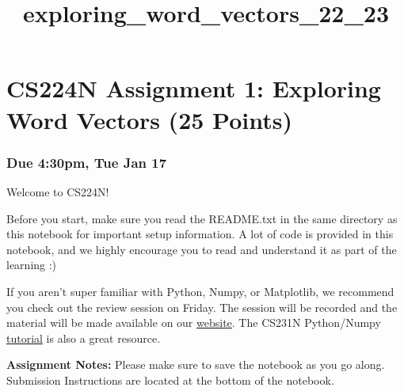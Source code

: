 \documentclass[11pt]{article}
\title{exploring\_word\_vectors\_22\_23}
\begin{document}
    
    \maketitle
    
    

    
    \hypertarget{cs224n-assignment-1-exploring-word-vectors-25-points}{%
\section{CS224N Assignment 1: Exploring Word Vectors (25
Points)}\label{cs224n-assignment-1-exploring-word-vectors-25-points}}

\hypertarget{due-430pm-tue-jan-17}{%
\subsubsection{\texorpdfstring{ Due 4:30pm, Tue Jan 17
}{ Due 4:30pm, Tue Jan 17 }}\label{due-430pm-tue-jan-17}}

Welcome to CS224N!

Before you start, make sure you read the README.txt in the same
directory as this notebook for important setup information. A lot of
code is provided in this notebook, and we highly encourage you to read
and understand it as part of the learning :)

If you aren't super familiar with Python, Numpy, or Matplotlib, we
recommend you check out the review session on Friday. The session will
be recorded and the material will be made available on our
\href{http://web.stanford.edu/class/cs224n/index.html\#schedule}{website}.
The CS231N Python/Numpy
\href{https://cs231n.github.io/python-numpy-tutorial/}{tutorial} is also
a great resource.

\textbf{Assignment Notes:} Please make sure to save the notebook as you
go along. Submission Instructions are located at the bottom of the
notebook.
\end{document}
